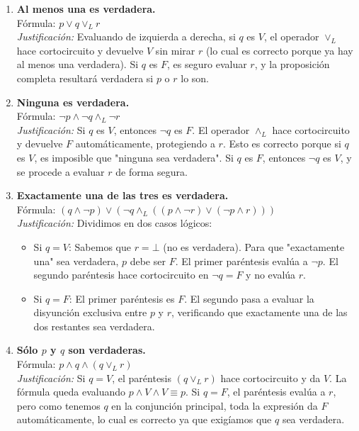 \begin{enumerate}[label=\textbf{\alph*)}]

    \item \textbf{Al menos una es verdadera.} \\
    Fórmula: $p \vee q \vee_L r$ \\
    \textit{Justificación:} Evaluando de izquierda a derecha, si $q$ es $V$, el operador $\vee_L$ hace cortocircuito y devuelve $V$ sin mirar $r$ (lo cual es correcto porque ya hay al menos una verdadera). Si $q$ es $F$, es seguro evaluar $r$, y la proposición completa resultará verdadera si $p$ o $r$ lo son.

    \vspace{0.4cm}
    \item \textbf{Ninguna es verdadera.} \\
    Fórmula: $\neg p \wedge \neg q \wedge_L \neg r$ \\
    \textit{Justificación:} Si $q$ es $V$, entonces $\neg q$ es $F$. El operador $\wedge_L$ hace cortocircuito y devuelve $F$ automáticamente, protegiendo a $r$. Esto es correcto porque si $q$ es $V$, es imposible que "ninguna sea verdadera". Si $q$ es $F$, entonces $\neg q$ es $V$, y se procede a evaluar $r$ de forma segura.

    \vspace{0.4cm}
    \item \textbf{Exactamente una de las tres es verdadera.} \\
    Fórmula: $(q \wedge \neg p) \vee (\neg q \wedge_L ((p \wedge \neg r) \vee (\neg p \wedge r)))$ \\
    \textit{Justificación:} Dividimos en dos casos lógicos:
    \begin{itemize}
        \item Si $q=V$: Sabemos que $r=\bot$ (no es verdadera). Para que "exactamente una" sea verdadera, $p$ debe ser $F$. El primer paréntesis evalúa a $\neg p$. El segundo paréntesis hace cortocircuito en $\neg q = F$ y no evalúa $r$.
        \item Si $q=F$: El primer paréntesis es $F$. El segundo pasa a evaluar la disyunción exclusiva entre $p$ y $r$, verificando que exactamente una de las dos restantes sea verdadera.
    \end{itemize}

    \vspace{0.4cm}
    \item \textbf{Sólo $p$ y $q$ son verdaderas.} \\
    Fórmula: $p \wedge q \wedge (q \vee_L r)$ \\
    \textit{Justificación:} Si $q=V$, el paréntesis $(q \vee_L r)$ hace cortocircuito y da $V$. La fórmula queda evaluando $p \wedge V \wedge V \equiv p$. Si $q=F$, el paréntesis evalúa a $r$, pero como tenemos $q$ en la conjunción principal, toda la expresión da $F$ automáticamente, lo cual es correcto ya que exigíamos que $q$ sea verdadera.


\end{enumerate}
